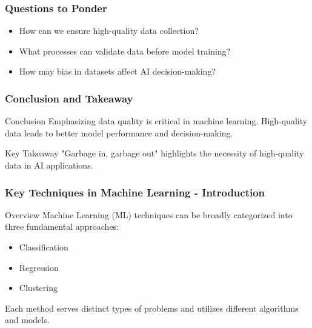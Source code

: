 \documentclass[aspectratio=169]{beamer}
\begin{document}
\begin{frame}[fragile]
    \frametitle{Questions to Ponder}
    \begin{itemize}
        \item How can we ensure high-quality data collection?
        \item What processes can validate data before model training?
        \item How may bias in datasets affect AI decision-making?
    \end{itemize}
\end{frame}

\begin{frame}[fragile]
    \frametitle{Conclusion and Takeaway}
    \begin{block}{Conclusion}
        Emphasizing data quality is critical in machine learning. High-quality data leads to better model performance and decision-making.
    \end{block}
    \begin{block}{Key Takeaway}
        "Garbage in, garbage out" highlights the necessity of high-quality data in AI applications.
    \end{block}
\end{frame}

\begin{frame}[fragile]
    \frametitle{Key Techniques in Machine Learning - Introduction}
    \begin{block}{Overview}
        Machine Learning (ML) techniques can be broadly categorized into three fundamental approaches: 
        \begin{itemize}
            \item Classification
            \item Regression
            \item Clustering
        \end{itemize}
        Each method serves distinct types of problems and utilizes different algorithms and models.
    \end{block}
\end{frame}
\end{document}
